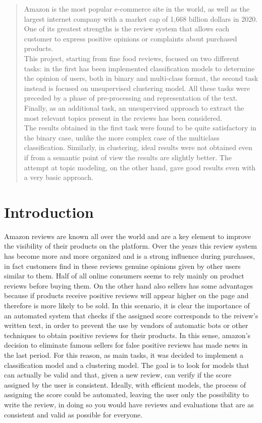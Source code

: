 \documentclass[11pt]{article}
\begin{document}
\thispagestyle{empty}
  \tableofcontents


\clearpage
\setcounter{page}{0}
\setcounter{page}{1}

\begin{abstract}
Amazon is the most popular e-commerce site in the world, as well as the largest internet company with a market cap of 1,668 billion dollars in 2020. One of its greatest strengths is the review system that allows each customer to express positive opinions or complaints about purchased products. \\
This project, starting from fine food reviews, focused on two different tasks: in the first has been implemented classification models to determine the opinion of users, both in binary and multi-class format, the second task instead is focused on unsupervised clustering model. All these tasks were preceded by a phase of pre-processing and representation of the text. Finally, as an additional task, an unsupervised approach to extract the most relevant topics present in the reviews has been considered.\\
The results obtained in the first task were found to be quite satisfactory in the binary case, unlike the more complex case of the multiclass classification. Similarly, in clustering, ideal results were not obtained even if from a semantic point of view the results are slightly better. The attempt at topic modeling, on the other hand, gave good results even with a very basic approach. 
\end{abstract}


\section{Introduction}
Amazon reviews are known all over the world and are a key element to improve the visibility of their products on the platform.
Over the years this review system has become more and more organized and is a strong influence during purchases, in fact customers find in these reviews genuine opinions given by other users similar to them. Half of all online consumers seems to rely mainly on product reviews before buying them. On the other hand also sellers has some advantages because if products receive positive reviews will appear higher on the page and therefore is more likely to be sold. In this scenario, it is clear the importance of an automated system that checks if the assigned score corresponds to the reivew's written text, in order to prevent the use by vendors of automatic bots or other techniques to obtain positive reviews for their products. In this sense, amazon's decision to eliminate famous sellers for false positive reviews has made news in the last period.
For this reason, as main tasks, it was decided to implement a classification model and a clustering model. 
The goal is to look for models that can actually be valid and that, given a new review, can verify if the score assigned by the user is consistent. Ideally, with efficient models, the process of assigning the score could be automated, leaving the user only the possibility to write the review, in doing so you would have reviews and evaluations that are as consistent and valid as possible for everyone.
\end{document}
